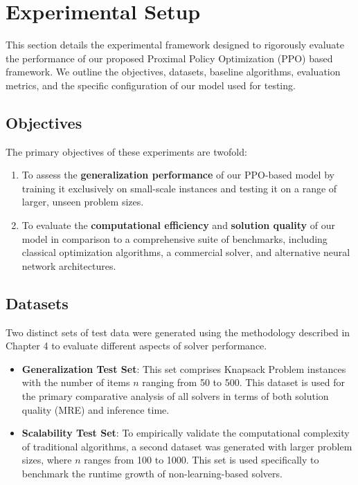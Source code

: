 
\section{Experimental Setup}
\label{sec:experimental_setup}

This section details the experimental framework designed to rigorously evaluate the performance of our proposed Proximal Policy Optimization (PPO) based framework. We outline the objectives, datasets, baseline algorithms, evaluation metrics, and the specific configuration of our model used for testing.

\subsection{Objectives}
The primary objectives of these experiments are twofold:
\begin{enumerate}
    \item To assess the \textbf{generalization performance} of our PPO-based model by training it exclusively on small-scale instances and testing it on a range of larger, unseen problem sizes.
    \item To evaluate the \textbf{computational efficiency} and \textbf{solution quality} of our model in comparison to a comprehensive suite of benchmarks, including classical optimization algorithms, a commercial solver, and alternative neural network architectures.
\end{enumerate}

\subsection{Datasets}
Two distinct sets of test data were generated using the methodology described in Chapter 4 to evaluate different aspects of solver performance.
\begin{itemize}
    \item \textbf{Generalization Test Set}: This set comprises Knapsack Problem instances with the number of items $n$ ranging from 50 to 500. This dataset is used for the primary comparative analysis of all solvers in terms of both solution quality (MRE) and inference time.
    \item \textbf{Scalability Test Set}: To empirically validate the computational complexity of traditional algorithms, a second dataset was generated with larger problem sizes, where $n$ ranges from 100 to 1000. This set is used specifically to benchmark the runtime growth of non-learning-based solvers.
\end{itemize}

